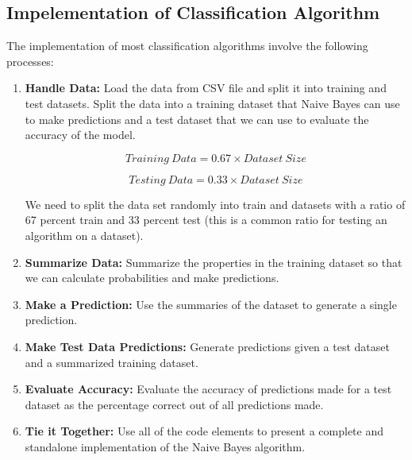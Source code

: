 \subsection{Impelementation of Classification Algorithm}{
The implementation of most classification algorithms involve the following processes:

\begin{enumerate}
  \item \textbf{Handle Data:} Load the data from CSV file and split it into training and test datasets. Split the data into a training dataset that Naive Bayes can use to make predictions and a test dataset that we can use to evaluate the accuracy of the model. 
  
  \begin{equation}
      Training\ Data = 0.67 \times Dataset\ Size
  \end{equation}
  
   \begin{equation}
      Testing\ Data = 0.33 \times Dataset\ Size
  \end{equation}
 
  
  
  We need to split the data set randomly into train and datasets with a ratio of 67 percent train and 33 percent test (this is a common ratio for testing an algorithm on a dataset).


 \item \textbf{Summarize Data: } Summarize the properties in the training dataset so that we can calculate probabilities and make predictions.
 \item \textbf{Make a Prediction:} Use the summaries of the dataset to generate a single prediction.
 \item \textbf{Make Test Data Predictions:} Generate predictions given a test dataset and a summarized training dataset.
\item \textbf{Evaluate Accuracy:} Evaluate the accuracy of predictions made for a test dataset as the percentage correct out of all predictions made.
\item \textbf{Tie it Together:} Use all of the code elements to present a complete and standalone implementation of the Naive Bayes algorithm.
 
\end{enumerate}
}


